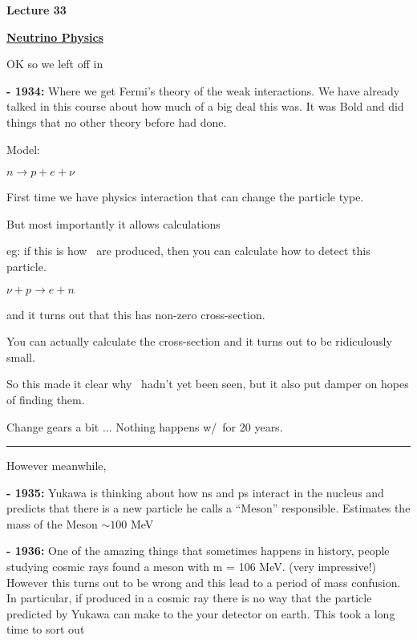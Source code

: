 



\thispagestyle{fancy}

\begin{center}
{\huge \textbf{Lecture 33}}
\end{center}

{\fontsize{14}{16}\selectfont

\textbf{\underline{Neutrino Physics}} 

OK so we left off in

\textbf{- 1934:} Where we get Fermi's theory of the weak interactions.  We have already talked in this course about how much of a big deal this was. 
It was Bold and did things that no other theory before had done. 

Model: 

\bc
$n \rightarrow p + e + \nu$
\ec

First time we have physics interaction that can change the particle type. 

But most importantly it allows calculations 

eg: if this is how \nus\ are produced, then you can calculate how to detect this particle. 

\bc
$\nu + p \rightarrow e + n$
\ec

and it turns out that this has non-zero cross-section. 

You can actually calculate the cross-section and it turns out to be ridiculously small.

So this made it clear why \nus\ hadn't yet been seen, but it also put damper on hopes of finding them. 



Change gears a bit ... Nothing happens w/\nus\ for 20 years.

\noindent\rule{\textwidth}{1pt}

However meanwhile, 

\textbf{- 1935:} Yukawa is thinking about how ns and ps interact in the nucleus and predicts that there is a new particle he calls a ``Meson'' responsible. 
Estimates the mass of the Meson $\sim 100$ MeV


\textbf{- 1936:} One of the amazing things that sometimes happens in history, people studying cosmic rays found a meson with m = 106 MeV. (very impressive!)
However this turns out to be wrong and this lead to a period of mass confusion.   
In particular, if produced in a cosmic ray there is no way that the particle predicted by Yukawa can make to the your detector on earth. 
This took a long time to sort out

}

